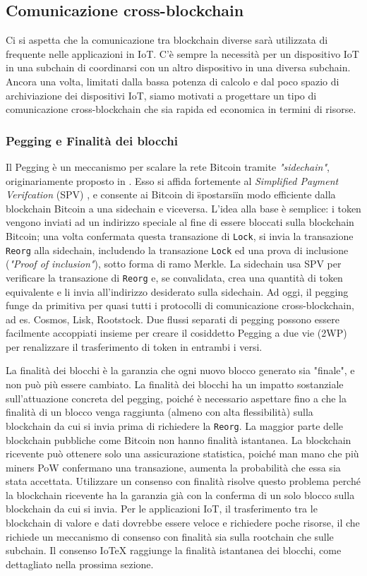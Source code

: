 \documentclass[a4paper,12pt]{article}
\begin{document}
\subsection{Comunicazione cross-blockchain}
Ci si aspetta che la comunicazione tra blockchain diverse sarà utilizzata di frequente nelle applicazioni in IoT. C'è sempre la necessità per un dispositivo IoT in una subchain di coordinarsi con un altro dispositivo in una diversa subchain. Ancora una volta, limitati dalla bassa potenza di calcolo e dal poco spazio di archiviazione dei dispositivi IoT, siamo motivati a progettare un tipo di comunicazione cross-blockchain che sia rapida ed economica in termini di risorse.

\subsubsection{Pegging e Finalità dei blocchi}
Il Pegging è un meccanismo per scalare la rete Bitcoin tramite \emph{"sidechain"}, originariamente
proposto in \cite{c1}. Esso si affida fortemente al \emph{Simplified Payment Verifcation} (SPV) \cite{c21}, e consente ai Bitcoin di \"spostarsi\" in modo efficiente dalla blockchain Bitcoin a una sidechain
e viceversa. L'idea alla base è semplice: i token vengono inviati ad un indirizzo speciale al fine di essere bloccati sulla blockchain Bitcoin; una volta confermata questa transazione di \texttt{Lock}, si invia la transazione \texttt{Reorg} alla sidechain, includendo la transazione \texttt{Lock} ed una
prova di inclusione (\emph{"Proof of inclusion"}), sotto forma di ramo Merkle. La sidechain usa SPV per verificare la transazione di \texttt{Reorg} e, se convalidata, crea una quantità di token equivalente e li invia all'indirizzo desiderato sulla sidechain. Ad oggi, il pegging funge da
primitiva per quasi tutti i protocolli di comunicazione cross-blockchain, ad es. Cosmos, Lisk,
Rootstock. Due flussi separati di pegging possono essere facilmente accoppiati insieme per creare il
cosiddetto Pegging a due vie (2WP) per renalizzare il trasferimento di token in entrambi i versi.

La finalità dei blocchi è la garanzia che ogni nuovo blocco generato sia "finale", e non può più essere
cambiato. La finalità dei blocchi ha un impatto sostanziale sull'attuazione concreta del pegging,
poiché è necessario aspettare fino a che la finalità di un blocco venga raggiunta (almeno con alta flessibilità) sulla blockchain da cui si invia prima di richiedere la \texttt{Reorg}. La maggior parte delle blockchain pubbliche come Bitcoin non hanno finalità istantanea. La blockchain ricevente può ottenere solo una assicurazione statistica, poiché man mano che più miners PoW confermano una transazione, aumenta la probabilità che essa sia stata accettata. Utilizzare un consenso con finalità risolve questo problema perché la blockchain ricevente ha la garanzia già con la conferma di un solo blocco sulla blockchain da cui si invia. Per le applicazioni IoT, il trasferimento tra le blockchain di valore e dati dovrebbe essere veloce e richiedere poche risorse, il che richiede un meccanismo di consenso con finalità sia sulla rootchain che sulle subchain. Il consenso IoTeX raggiunge la finalità istantanea dei blocchi, come dettagliato nella prossima sezione.
\end{document}
